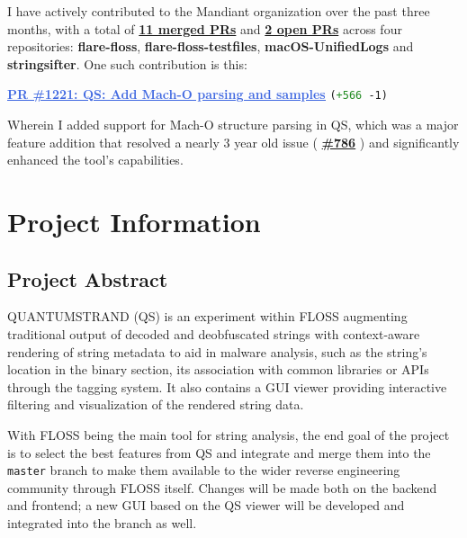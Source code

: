 \documentclass[12pt]{article}
\newcommand{\issue}[1]{%
    \href{https://github.com/mandiant/flare-floss/issues/#1}{\textbf{\##1}}%
}
\begin{document}
I have actively contributed to the Mandiant organization over the past three months, with a total of \textbf{\href{https://github.com/pulls?q=is\%3Apr+org\%3Amandiant+author\%3Avee1e+is\%3Amerged}{\textcolor{githubPurple}{11 merged PRs}}} and \textbf{\href{https://github.com/pulls?q=is\%3Apr+org\%3Amandiant+author\%3Avee1e+is\%3Aopen}{\textcolor{githubGreen}{2 open PRs}}} across four repositories: \textbf{flare-floss}, \textbf{flare-floss-testfiles}, \textbf{macOS-UnifiedLogs} and \textbf{stringsifter}. One such contribution is this:

\begin{center}
    \href{https://github.com/mandiant/flare-floss/pull/1221}{\textcolor{RoyalBlue}{\underline{\textbf{PR \#1221: QS: Add Mach-O parsing and samples}}}} \texttt{(\textcolor{ForestGreen}{+566} \textcolor{BrickRed}{-1})}
\end{center}

Wherein I added support for Mach-O structure parsing in QS, which was a major feature addition that resolved a nearly 3 year old issue (\issue{786}) and significantly enhanced the tool's capabilities.

\newpage
\section*{Project Information}
{}

\subsection*{Project Abstract}
{}


QUANTUMSTRAND (QS) is an experiment within FLOSS augmenting traditional output of decoded and deobfuscated strings with context-aware rendering of string metadata to aid in malware analysis, such as the string's location in the binary section, its association with common libraries or APIs through the tagging system. It also contains a GUI viewer providing interactive filtering and visualization of the rendered string data.

With FLOSS being the main tool for string analysis, the end goal of the project is to select the best features from QS and integrate and merge them into the \texttt{master} branch to make them available to the wider reverse engineering community through FLOSS itself. Changes will be made both on the backend and frontend; a new GUI based on the QS viewer will be developed and integrated into the branch as well.
\end{document}
